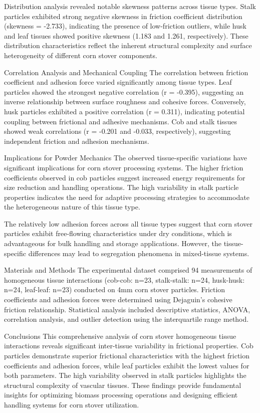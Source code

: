 \documentclass[xcolor=dvipsnames,10pt,hidelinks]{article}
\begin{document}
\begin{itemize}
Distribution analysis revealed notable skewness patterns across tissue types. Stalk particles exhibited strong negative skewness in friction coefficient distribution (skewness = -2.733), indicating the presence of low-friction outliers, while husk and leaf tissues showed positive skewness (1.183 and 1.261, respectively). These distribution characteristics reflect the inherent structural complexity and surface heterogeneity of different corn stover components.

Correlation Analysis and Mechanical Coupling
The correlation between friction coefficient and adhesion force varied significantly among tissue types. Leaf particles showed the strongest negative correlation (r = -0.395), suggesting an inverse relationship between surface roughness and cohesive forces. Conversely, husk particles exhibited a positive correlation (r = 0.311), indicating potential coupling between frictional and adhesive mechanisms. Cob and stalk tissues showed weak correlations (r = -0.201 and -0.033, respectively), suggesting independent friction and adhesion mechanisms.

Implications for Powder Mechanics
The observed tissue-specific variations have significant implications for corn stover processing systems. The higher friction coefficients observed in cob particles suggest increased energy requirements for size reduction and handling operations. The high variability in stalk particle properties indicates the need for adaptive processing strategies to accommodate the heterogeneous nature of this tissue type.

The relatively low adhesion forces across all tissue types suggest that corn stover particles exhibit free-flowing characteristics under dry conditions, which is advantageous for bulk handling and storage applications. However, the tissue-specific differences may lead to segregation phenomena in mixed-tissue systems.

Materials and Methods
The experimental dataset comprised 94 measurements of homogeneous tissue interactions (cob-cob: n=23, stalk-stalk: n=24, husk-husk: n=24, leaf-leaf: n=23) conducted on 4mm corn stover particles. Friction coefficients and adhesion forces were determined using Dejaguin's cohesive friction relationship. Statistical analysis included descriptive statistics, ANOVA, correlation analysis, and outlier detection using the interquartile range method.

Conclusions
This comprehensive analysis of corn stover homogeneous tissue interactions reveals significant inter-tissue variability in frictional properties. Cob particles demonstrate superior frictional characteristics with the highest friction coefficients and adhesion forces, while leaf particles exhibit the lowest values for both parameters. The high variability observed in stalk particles highlights the structural complexity of vascular tissues. These findings provide fundamental insights for optimizing biomass processing operations and designing efficient handling systems for corn stover utilization.


\end{itemize}
\end{document}
